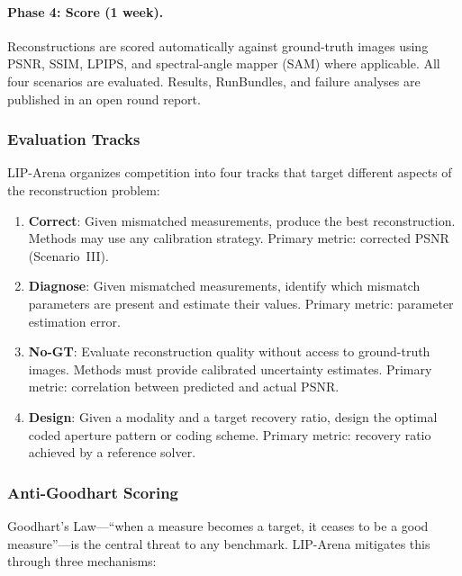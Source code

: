 \paragraph{Phase 4: Score (1 week).}
Reconstructions are scored automatically against ground-truth images
using PSNR, SSIM, LPIPS, and spectral-angle mapper (SAM) where
applicable.
All four scenarios are evaluated.
Results, RunBundles, and failure analyses are published in an open
round report.

\subsubsection{Evaluation Tracks}
\label{sec:tracks}

LIP-Arena organizes competition into four tracks that target different
aspects of the reconstruction problem:

\begin{enumerate}
  \item \textbf{Correct}: Given mismatched measurements, produce the
        best reconstruction.
        Methods may use any calibration strategy.
        Primary metric: corrected PSNR (Scenario~III).
  \item \textbf{Diagnose}: Given mismatched measurements, identify
        which mismatch parameters are present and estimate their
        values.
        Primary metric: parameter estimation error.
  \item \textbf{No-GT}: Evaluate reconstruction quality without
        access to ground-truth images.
        Methods must provide calibrated uncertainty estimates.
        Primary metric: correlation between predicted and actual PSNR.
  \item \textbf{Design}: Given a modality and a target recovery ratio,
        design the optimal coded aperture pattern or coding scheme.
        Primary metric: recovery ratio achieved by a reference solver.
\end{enumerate}

\subsubsection{Anti-Goodhart Scoring}
\label{sec:anti_goodhart}

Goodhart's Law---``when a measure becomes a target, it ceases to be a
good measure''---is the central threat to any benchmark.
LIP-Arena mitigates this through three mechanisms:

